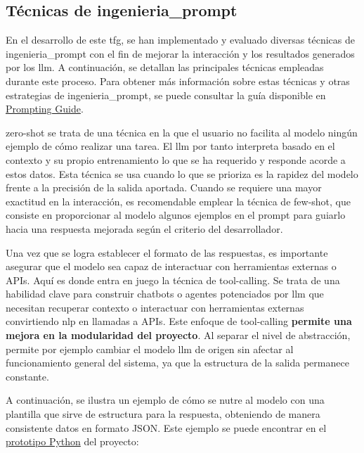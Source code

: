 	\subsection{Técnicas de \gls{ingenieria_prompt}}
	En el desarrollo de este \acrshort{tfg}, se han implementado y evaluado diversas técnicas de \gls{ingenieria_prompt} con el fin de mejorar la interacción y los resultados generados por los \acrshort{llm}. A continuación, se detallan las principales técnicas empleadas durante este proceso. Para obtener más información sobre estas técnicas y otras estrategias de \gls{ingenieria_prompt}, se puede consultar la guía disponible en \href{https://www.promptingguide.ai/es}{Prompting Guide}\cite{promptingguide}.
	
	\gls{zero-shot} se trata de una técnica en la que el usuario no facilita al modelo ningún ejemplo de cómo realizar una tarea. El \acrshort{llm} por tanto interpreta basado en el contexto y su propio entrenamiento lo que se ha requerido y responde acorde a estos datos. Esta técnica se usa cuando lo que se prioriza es la rapidez del modelo frente a la precisión de la salida aportada. Cuando se requiere una mayor exactitud en la interacción, es recomendable emplear la técnica de \gls{few-shot}, que consiste en proporcionar al modelo algunos ejemplos en el prompt para guiarlo hacia una respuesta mejorada según el criterio del desarrollador.
	
	Una vez que se logra establecer el formato de las respuestas, es importante asegurar que el modelo sea capaz de interactuar con herramientas externas o APIs. Aquí es donde entra en juego la técnica de \gls{tool-calling}.
	Se trata de una habilidad clave para construir chatbots o agentes potenciados por \acrshort{llm} que necesitan recuperar contexto o interactuar con herramientas externas convirtiendo \acrlong{nlp} en llamadas a APIs.
	Este enfoque de \gls{tool-calling} \textbf{permite una mejora en la modularidad del proyecto}. Al separar el nivel de abstracción, permite por ejemplo cambiar el modelo \acrshort{llm} de origen sin afectar al funcionamiento general del sistema, ya que la estructura de la salida permanece constante.

	A continuación, se ilustra un ejemplo de cómo se nutre al modelo con una plantilla que sirve de estructura para la respuesta, obteniendo de manera consistente datos en formato JSON. Este ejemplo se puede encontrar en el \href{https://github.com/fps1001/TFGII_FPisot/tree/main/project-prototypes/prompting.ipynb}{prototipo Python} del proyecto: 
	
